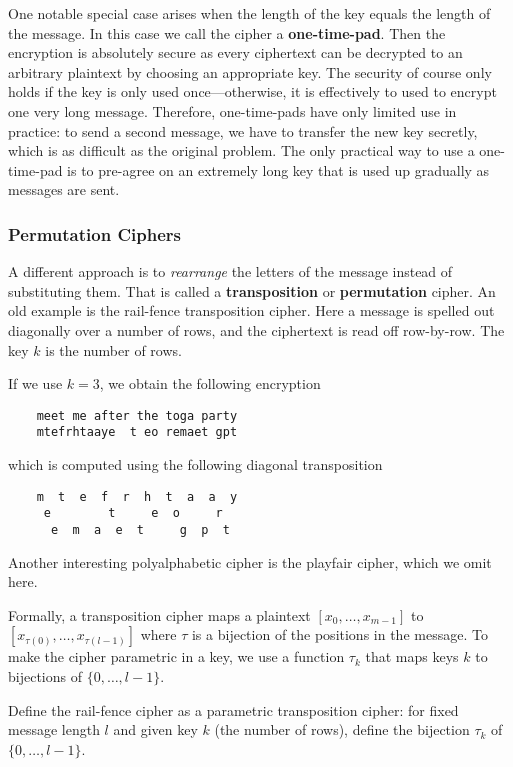 One notable special case arises when the length of the key equals the length of the message.
In this case we call the cipher a \textbf{one-time-pad}.
Then the encryption is absolutely secure as every ciphertext can be decrypted to an arbitrary plaintext by choosing an appropriate key.
The security of course only holds if the key is only used once---otherwise, it is effectively to used to encrypt one very long message.
Therefore, one-time-pads have only limited use in practice: to send a second message, we have to transfer the new key secretly, which is as difficult as the original problem.
The only practical way to use a one-time-pad is to pre-agree on an extremely long key that is used up gradually as messages are sent.

\subsubsection{Permutation Ciphers}

A different approach is to \emph{rearrange} the letters of the message instead of substituting them.
That is called a \textbf{transposition} or \textbf{permutation} cipher.
An old example is the rail-fence transposition cipher.
Here a message is spelled out diagonally over a number of rows, and the ciphertext is read off row-by-row.
The key $k$ is the number of rows.

\begin{example}
 If we use $k=3$, we obtain the following encryption
  \begin{lstlisting}
    meet me after the toga party
    mtefrhtaaye  t eo remaet gpt
  \end{lstlisting}
which is computed using the following diagonal transposition
  \begin{lstlisting}
    m  t  e  f  r  h  t  a  a  y
     e        t     e  o     r
      e  m  a  e  t     g  p  t
  \end{lstlisting}
\end{example}
Another interesting polyalphabetic cipher is the playfair cipher, which we omit here.

Formally, a transposition cipher maps a plaintext $[x_0,\ldots,x_{m-1}]$ to $[x_{\tau(0)},\ldots,x_{\tau(l-1)}]$ where $\tau$ is a bijection of the positions in the message.
To make the cipher parametric in a key, we use a function $\tau_k$ that maps keys $k$ to bijections of $\{0,\ldots,l-1\}$.

\begin{exercise}
Define the rail-fence cipher as a parametric transposition cipher: for fixed message length $l$ and given key $k$ (the number of rows), define the bijection $\tau_k$ of $\{0,\ldots,l-1\}$.
\end{exercise}

